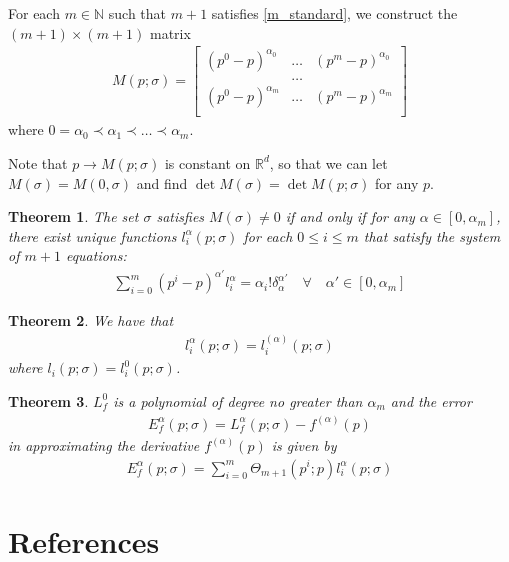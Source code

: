 \documentclass{article}
\newtheorem{theorem}{Theorem}[section]
\theoremstyle{case}
\newcommand{\naturals}{\mathbb N}
\begin{document}
For each $m \in \naturals$ such that $m+1$ satisfies \cref{m_standard}, we construct the $(m+1) \times (m+1)$ matrix 
\begin{align*}
M(p; \sigma) = \begin{bmatrix}
\left(p^0 - p\right)^{\alpha_0} & \ldots & \left(p^m - p\right)^{\alpha_0} \\
&\ldots & \\
\left(p^0 - p\right)^{\alpha_m} & \ldots & \left(p^m - p\right)^{\alpha_m} \\
\end{bmatrix}
\end{align*}
where $0 = \alpha_0 \prec \alpha_1 \prec \ldots \prec \alpha_m$.

Note that $p \to M(p; \sigma)$ is constant on $\mathbb R^d$, so that we can let $M(\sigma) = M(0, \sigma)$ and find $\det M(\sigma) = \det M(p; \sigma)$ for any $p$.

\begin{theorem}
The set $\sigma$ satisfies $M(\sigma) \ne 0$ if and only if for any $\alpha \in [0, \alpha_m]$, there exist 
unique functions $l_i^{\alpha}(p; \sigma)$ for each $0\le i\le m$ that satisfy the system of $m+1$ equations:
\begin{align*}
\sum_{i=0}^m \left(p^i - p\right)^{\alpha'} l_i^{\alpha} = \alpha_i!\delta_{\alpha}^{\alpha'} \quad \forall \quad \alpha' \in [0, \alpha_m]
\end{align*}
\end{theorem}

\begin{theorem}
We have that
\begin{align*}
l_i^{\alpha}(p; \sigma) = l_i^{(\alpha)}(p; \sigma)
\end{align*}
where $l_i(p; \sigma) = l_i^{0}(p; \sigma)$.
\end{theorem}

\begin{theorem}
$L_f^0$ is a polynomial of degree no greater than $\alpha_m$ and the error
\begin{align*}
E_f^{\alpha}(p; \sigma) = L_f^{\alpha}(p; \sigma) - f^{(\alpha)}(p)
\end{align*}
in approximating the derivative $f^{(\alpha)}(p)$ is given by
\begin{align*}
E_f^{\alpha}(p; \sigma) = \sum_{i=0}^m \Theta_{m+1}(p^i; p) l_i^{\alpha}(p; \sigma)
\end{align*}
\end{theorem}


\section{References}
\end{document}
